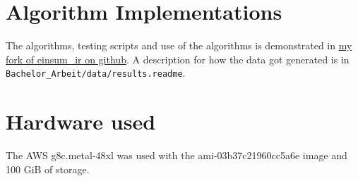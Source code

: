 \appendix

\section{Algorithm Implementations}

The algorithms, testing scripts and use of the algorithms is demonstrated in 
\href{https://github.com/Minutenreis/einsum_ir}{my fork of einsum\_ir on github}.
A description for how the data got generated is in \\
\texttt{Bachelor\_Arbeit/data/results.readme}.

\section{Hardware used}

The AWS g8c.metal-48xl was used with the ami-03b37c21960cc5a6e image and 100 GiB of storage.
